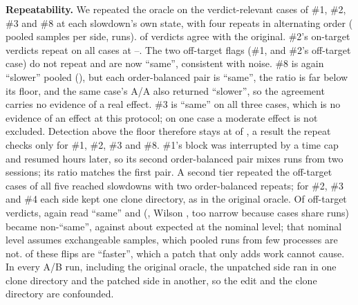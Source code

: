 \textbf{Repeatability.} We repeated the oracle on the verdict-relevant cases of \#1, \#2, \#3 and \#8 at each slowdown's own state, with four repeats in alternating order (\RepSamples{} pooled samples per side, \RepRuns{} runs).
\RepAgree{} of \RepTotal{} verdicts agree with the original.
\#2's on-target verdicts repeat on all \SlowTwoCases{} cases at \RepTwoLo--\RepTwoHi\x.
The two off-target flags (\#1, and \#2's off-target case) do not repeat and are now ``same'', consistent with noise.
\#8 is again ``slower'' pooled (\RepEightRatio\x), but each order-balanced pair is ``same'', the ratio is far below its floor, and the same case's A/A also returned ``slower'', so the agreement carries no evidence of a real effect.
\#3 is ``same'' on all three cases, which is no evidence of an effect at this protocol; on one case a moderate effect is not excluded.
Detection above the floor therefore stays at \FloorDetect{} of \NumSlowdowns, a result the repeat checks only for \#1, \#2, \#3 and \#8.
\#1's block was interrupted by a time cap and resumed hours later, so its second order-balanced pair mixes runs from two sessions; its ratio matches the first pair.
A second tier repeated the off-target cases of all five reached slowdowns with two order-balanced repeats; for \#2, \#3 and \#4 each side kept one clone directory, as in the original oracle.
Of \TwoTotal{} off-target verdicts, \TwoAgree{} again read ``same'' and \TwoFlips{} (\TwoFlipPct\pct, Wilson \ci{\TwoFlipLo}{\TwoFlipHi}, too narrow because cases share runs) became non-``same'', against about \TwoExpected{} expected at the nominal level; that nominal level assumes exchangeable samples, which pooled runs from few processes are not.
\TwoFaster{} of these flips are ``faster'', which a patch that only adds work cannot cause.
In every A/B run, including the original oracle, the unpatched side ran in one clone directory and the patched side in another, so the edit and the clone directory are confounded.

